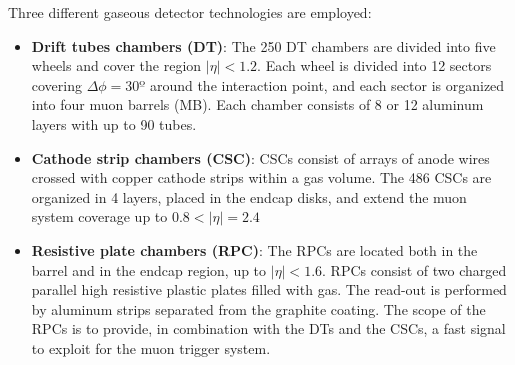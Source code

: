 Three different gaseous detector technologies are employed:
\begin{itemize}
    \item \textbf{Drift tubes chambers (DT)}: The 250 DT chambers are divided into five wheels and cover the region $|\eta|<1.2$. Each wheel is divided into 12 sectors covering $\Delta \phi=30º$ around the interaction point, and each sector is organized into four muon barrels (MB).
    Each chamber consists of 8 or 12 aluminum layers with up to 90 tubes.

    \item \textbf{Cathode strip chambers (CSC)}: CSCs consist of arrays of anode wires crossed with copper cathode strips within a gas volume. The 486 CSCs are organized in 4 layers, placed in the endcap disks, and extend the muon system coverage up to $0.8<|\eta|=2.4$

    
    \item \textbf{Resistive plate chambers (RPC)}: The RPCs are located both in the barrel and in the endcap region, up to $|\eta|<1.6$. RPCs consist of two charged parallel high resistive plastic plates filled with gas. The read-out is performed by aluminum strips separated from the graphite coating. The scope of the RPCs is to provide, in combination with the DTs and the CSCs, a fast signal to exploit for the muon trigger system.
\end{itemize}

